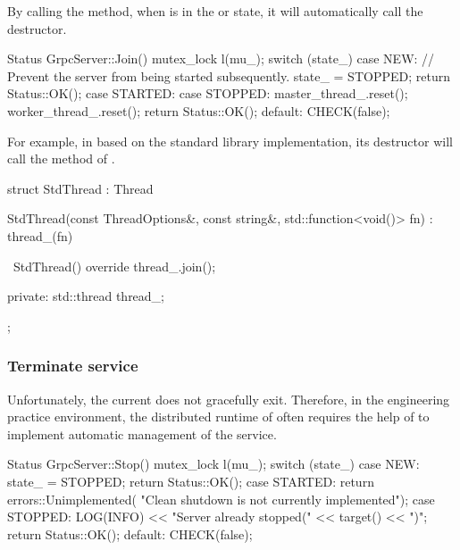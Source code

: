 \begin{content}
By calling the  method, when  is in the  or  state, it will automatically call the  destructor.

\begin{leftbar}
\begin{c++}
Status GrpcServer::Join() {
  mutex_lock l(mu_);
  switch (state_) {
    case NEW:
      // Prevent the server from being started subsequently.
      state_ = STOPPED;
      return Status::OK();
    case STARTED:
    case STOPPED:
      master_thread_.reset();
      worker_thread_.reset();
      return Status::OK();
    default:
      CHECK(false);
  }
}
\end{c++}
\end{leftbar}

For example, in  based on the  standard library implementation, its destructor will call the  method of .

\begin{leftbar}
\begin{c++}
struct StdThread : Thread {
  StdThread(const ThreadOptions&, const string&, 
      std::function<void()> fn)
    : thread_(fn) {
  }

  ~StdThread() override { 
    thread_.join(); 
  }

 private:
  std::thread thread_;
};
\end{c++}
\end{leftbar}


\subsubsection{Terminate service}
Unfortunately, the current  does not gracefully exit. Therefore, in the engineering practice environment, the distributed runtime of \tf{} often requires the help of  to implement automatic management of the  service.

\begin{leftbar}
\begin{c++}
Status GrpcServer::Stop() {
  mutex_lock l(mu_);
  switch (state_) {
    case NEW:
      state_ = STOPPED;
      return Status::OK();
    case STARTED:
      return errors::Unimplemented(
          "Clean shutdown is not currently implemented");
    case STOPPED:
      LOG(INFO) << "Server already stopped(" << target() << ")";
      return Status::OK();
    default:
      CHECK(false);
  }
}
\end{c++}
\end{leftbar}



\end{content}
